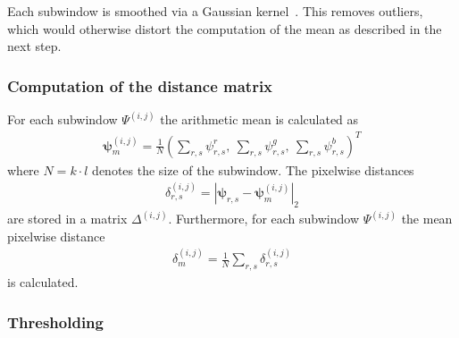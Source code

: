 Each subwindow is smoothed via a Gaussian kernel~\cite[p. 257f]{gonzalezwoods2002}. 
This removes outliers, which would otherwise distort the computation of the mean as described in the next step.





\subsubsection{Computation of the distance matrix}

For each subwindow $\Psi^{\left(i,j\right)}$ the arithmetic mean is calculated as
\begin{eqnarray}
  \bm{\psi}_{m}^{\left(i,j\right)} = \frac{1}{N} \left( \sum_{r,s} \psi_{r,s}^r,\ \sum_{r,s} \psi_{r,s}^g,\ \sum_{r,s} \psi_{r,s}^b \right)^T
\end{eqnarray}
where $N = k \cdot l$ denotes the size of the subwindow. The pixelwise distances
\begin{eqnarray}
  \delta_{r,s}^{\left(i,j\right)} = | \bm{\psi}_{r,s} - \bm{\psi}_{m}^{\left(i,j\right)} |_2
\end{eqnarray}
are stored in a matrix $\Delta^{\left(i,j\right)}$. Furthermore, for each subwindow $\Psi^{\left(i,j\right)}$ the mean pixelwise distance 
\begin{eqnarray}
  \delta_m^{\left(i,j\right)} = \frac{1}{N} \sum_{r,s} \delta_{r,s}^{\left(i,j\right)}
\end{eqnarray}
is calculated.





\subsubsection{Thresholding}

